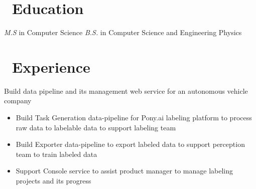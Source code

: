 \documentclass{resume}
\begin{document}



\section{\faGraduationCap\ Education}
\textit{M.S} in Computer Science
\textit{B.S.} in Computer Science and Engineering Physics

\section{\faUsers\ Experience}
Build data pipeline and its management web service for an autonomous vehicle company
\begin{itemize}
  \item Build Task Generation data-pipeline for Pony.ai labeling platform to process raw data to labelable data to support labeling team
  \item Build Exporter data-pipeline to export labeled data to support perception team to train labeled data
  \item Support Console service to assist product manager to manage labeling projects and its progress
\end{itemize}
\end{document}
